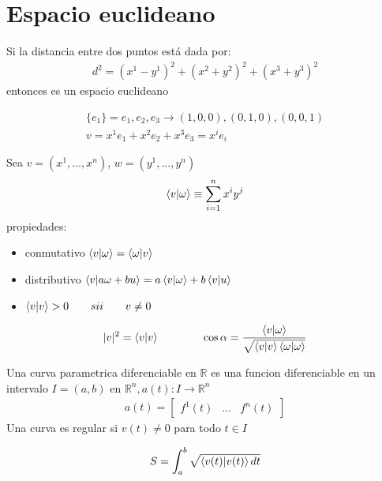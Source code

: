 \documentclass{article}
\newcommand{\caja}[3]{%
  \begin{tcolorbox}[colback=#1!5!white,colframe=#1!25!black,title=#2]
    #3
  \end{tcolorbox}%
}
\begin{document}
 \section{Espacio euclideano} %
 \label{sec:Espacio euclideano}
 Si la distancia entre dos puntos está dada por:
 \begin{gather}
  d^2 = (x^1-y^1)^2+ (x^2+y^2)^2 + (x^3+y^3)^2 
  \label{eq:distancia_euclideana}
 \end{gather}
 entonces es un espacio euclideano 
 \caja{red}{Vectores y bases en $ \mathbb{R}^3 $}{
  \begin{gather}
    \{ e_1\}= e_1,e_2,e_3 \rightarrow (1,0,0),(0,1,0),(0,0,1) \\
    v = x^1 e_1 + x^2 e_2 + x^3 e_3 = x^i e_i
    \label{eq:bases_r3}
  \end{gather}
 }
 \caja{red}{Producto escalar}{
  Sea $ v = (x^1,...,x^n) $, $ w = (y^1,...,y^n ) $
  \begin{gather}
    \bra{v}\ket{\omega} \equiv \displaystyle\sum_{i=1 }^{n }x^i y^j  
    \label{eq:producto_escalar}
  \end{gather}
  propiedades: 
  \begin{itemize}
    \item conmutativo $ \bra{v}\ket{\omega}=\bra{\omega}\ket{v}   $
    \item distributivo $ \bra{v}\ket{a\omega + b u } = a \bra{v}\ket{\omega} + b \bra{v}\ket{u }  $ 
    \item $ \bra{v}\ket{v}>0 \qquad sii \qquad v \neq 0    $
  \end{itemize}
  \tcblower
  \begin{gather}
    |v|^2 = \bra{v}\ket{v} \qquad \qquad \cos{\alpha} = \frac{\bra{v}\ket{\omega} }{\sqrt{\bra{v}\ket{v} \bra{\omega}\ket{\omega}  }  }   
    \label{eq:v2_y_angulo}
  \end{gather}
 }
 \caja{black}{curvas}{
  Una curva parametrica diferenciable en $ \mathbb{R}  $ es una funcion diferenciable en un intervalo $ I = (a,b) $ en $ \mathbb{R}^n, a(t) : I \rightarrow \mathbb{R}^n    $
  \begin{gather}
     a(t) = \begin{bmatrix} f^1(t) & ...  & f^n(t) \end{bmatrix} 
  \end{gather}
  Una curva es regular si $ v(t)\neq 0   $ para todo $ t\in I $
 }
 \caja{red}{longitud de arco }{
  \begin{gather}
    S = \int_{a }^{b }\sqrt{\bra{v(t)}\ket{v(t)}dt  }
    \label{eq:long_arco_euclideo}
  \end{gather}
 }
\end{document}
